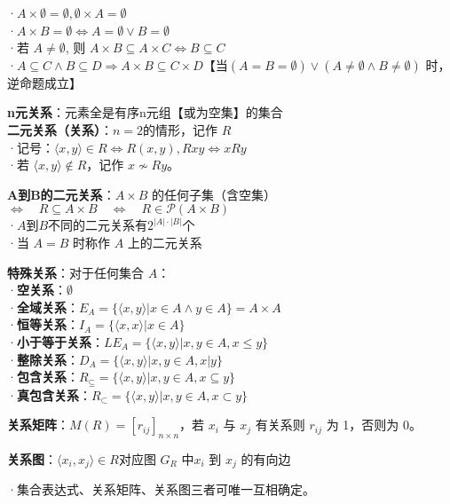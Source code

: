 	·$A \times \emptyset = \emptyset, \emptyset \times A = \emptyset$\\
	·$A \times B = \emptyset \Leftrightarrow A = \emptyset \lor B = \emptyset$\\
	·若 $A \neq \emptyset$, 则 $A \times B \subseteq A \times C \Leftrightarrow B \subseteq C$\\
	·$A \subseteq C \land B \subseteq D \Rightarrow A \times B \subseteq C \times D$【当$(A = B = \emptyset) \lor (A \neq \emptyset \land B \neq \emptyset)$ 时，逆命题成立】
	
	\textbf{n元关系}：元素全是有序n元组【或为空集】的集合\\
	\textbf{二元关系（关系）}：$n=2$的情形，记作 $R$\\
	·记号：$\langle x, y \rangle \in R \Leftrightarrow R(x,y), Rxy \Leftrightarrow x R y$\\
	·若 $\langle x, y \rangle \notin R$，记作 $x \not\sim R y$。
	
	\textbf{A到B的二元关系}：$A \times B$ 的任何子集（含空集）$\Leftrightarrow \quad R \subseteq A \times B \quad \Leftrightarrow \quad R \in \mathcal{P}(A \times B)$\\
	·$A$到$B$不同的二元关系有$2^{|A|\cdot|B|}$个\\
	·当 $A = B$ 时称作 $A$ 上的二元关系
	
	\textbf{特殊关系}：对于任何集合 $A$：\\
	·\textbf{空关系}：$\emptyset$ \\
	·\textbf{全域关系}：$E_A = \{ \langle x, y \rangle | x \in A \land y \in A \} = A \times A$ \\
	·\textbf{恒等关系}：$I_A = \{ \langle x, x \rangle | x \in A \}$ \\
	·\textbf{小于等于关系}：$LE_A = \{ \langle x, y \rangle | x, y \in A, x \leq y \}$ \\
	·\textbf{整除关系}：$D_A = \{ \langle x, y \rangle | x, y \in A, x | y \}$ \\
	·\textbf{包含关系}：$R_{\subseteq} = \{ \langle x, y \rangle | x, y \in A, x \subseteq y\}$\\
	·\textbf{真包含关系}：$R_{\subset} = \{ \langle x, y \rangle | x, y \in A, x \subset y\}$
		
	\textbf{关系矩阵}：$M(R)=[r_{ij}]_{n\times n}$，若 $x_i$ 与 $x_j$ 有关系则 $r_{ij}$ 为 1，否则为 0。
	
	\textbf{关系图}：$\langle x_i, x_j \rangle \in R$对应图 $G_R$ 中$x_i$ 到 $x_j$ 的有向边
	
	·集合表达式、关系矩阵、关系图三者可唯一互相确定。
	
